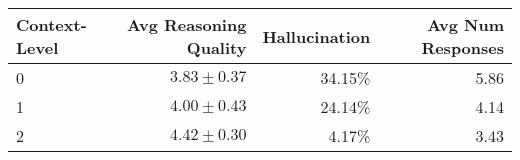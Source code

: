 \begin{tabular}{lrrr}
\toprule
Context-Level & Avg Reasoning Quality & Hallucination & Avg Num Responses \\
\midrule
0 & \( 3.83 \pm 0.37 \) & 34.15\% & 5.86 \\
1 & \( 4.00 \pm 0.43 \) & 24.14\% & 4.14 \\
2 & \( 4.42 \pm 0.30 \) & 4.17\% & 3.43 \\
\bottomrule
\end{tabular}
